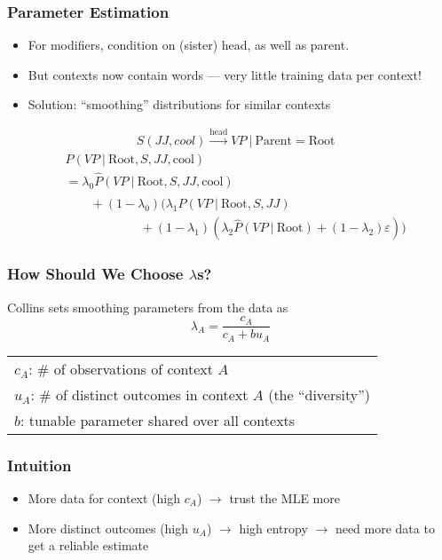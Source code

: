 \documentclass[11pt, serif, mathserif, table,trans]{beamer}
\begin{document}
\begin{frame}
  \frametitle{Parameter Estimation}
  \begin{itemize}
  \item For modifiers, condition on (sister) head, as well as parent.
  \item But contexts now contain words --- very little training data per
    context!
  \item Solution: ``smoothing'' distributions for similar contexts
  \end{itemize}
\pause
{\footnotesize
\begin{align*}
  &S(JJ,cool) \stackrel{\text{head}}{\to} VP\ 
  \vert\ \text{Parent} = \mathrm{Root}
\end{align*}
\begin{align*}
&P(VP\ \vert\ \mathrm{Root}, S, JJ, \text{cool}) \\
  & = \lambda_0 \hat{P}(VP\ \vert\ \mathrm{Root}, S, JJ, \text{cool})
  \\ & \qquad + (1 - \lambda_0)\big(\lambda_1 \hat{P}(VP\ \vert\ \mathrm{Root}, S, JJ) \\
    &\qquad \qquad \qquad + (1 - \lambda_1)(\lambda_2 \hat{P}(VP\ \vert\ \mathrm{Root}) + (1-\lambda_2) \varepsilon)\big)
\end{align*}
}
\end{frame}

\begin{frame}
  \frametitle{How Should We Choose $\lambda$s?}
  Collins sets smoothing parameters from the data as
    \begin{equation*}
      \label{eq:2}
      \lambda_{A} = \frac{c_A}{c_A + b u_A}
    \end{equation*}
    \begin{center}
    \begin{tabular}{l}
      $c_A$: \# of observations of context $A$ \\
      $u_A$: \# of distinct outcomes in context $A$ (the
      ``diversity'') \\
      $b$: tunable parameter shared over all contexts
    \end{tabular}
  \end{center}
\end{frame}
\begin{frame}
  \frametitle{Intuition}
  \begin{itemize}[<+->]
  \item More data for context (high $c_A$) $\to$ trust the MLE more
  \item More distinct outcomes (high $u_A$) $\to$ high entropy $\to$
    need more data to get a reliable estimate
  \end{itemize}
\end{frame}
\end{document}
